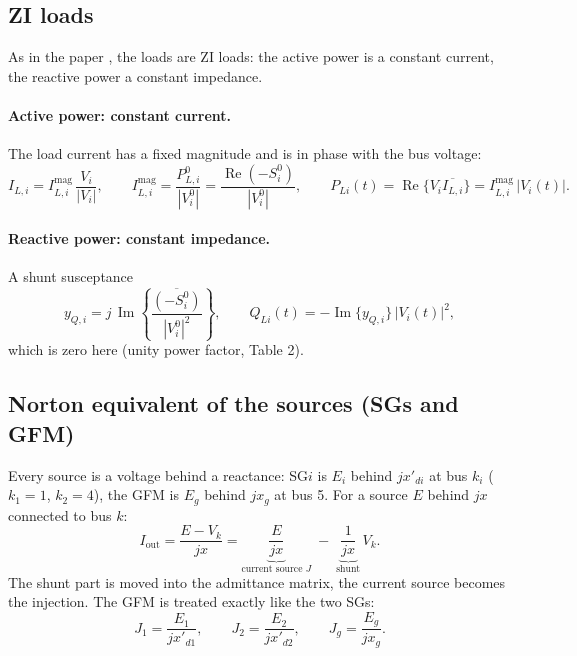 \documentclass[11pt,a4paper]{article}
\numberwithin{equation}{section}
\newcommand{\cj}[1]{\overline{#1}}
\newcommand{\re}{\operatorname{Re}}
\newcommand{\im}{\operatorname{Im}}
\begin{document}
\subsection{ZI loads}
As in the paper \cite{RA2021access}, the loads are ZI loads: the active power is a constant current, the reactive power a constant impedance.
\paragraph{Active power: constant current.} The load current has a fixed magnitude and is in phase with the bus voltage:
\begin{equation}
I_{L,i} = I_{L,i}^{\text{mag}}\,\frac{V_i}{|V_i|},\qquad
I_{L,i}^{\text{mag}} = \frac{P_{L,i}^0}{|V_i^0|} = \frac{\re(-S_i^0)}{|V_i^0|},\qquad
P_{Li}(t) = \re\{V_i\cj{I_{L,i}}\} = I_{L,i}^{\text{mag}}\,|V_i(t)| .
\end{equation}
\paragraph{Reactive power: constant impedance.} A shunt susceptance
\begin{equation}
y_{Q,i} = j\,\im\!\left\{\frac{\cj{(-S_i^0)}}{|V_i^0|^2}\right\},\qquad Q_{Li}(t) = -\im\{y_{Q,i}\}\,|V_i(t)|^2,
\end{equation}
which is zero here (unity power factor, Table 2).

\subsection{Norton equivalent of the sources (SGs and GFM)}
Every source is a voltage behind a reactance: SG$i$ is $E_i$ behind $jx'_{di}$ at bus $k_i$ ($k_1=1$, $k_2=4$), the GFM is $E_g$ behind $jx_g$ at bus 5. For a source $E$ behind $jx$ connected to bus $k$:
\begin{equation}
I_{\text{out}} = \frac{E - V_k}{jx} = \underbrace{\frac{E}{jx}}_{\text{current source } J}\; - \;\underbrace{\frac{1}{jx}}_{\text{shunt}}\,V_k .
\end{equation}
The shunt part is moved into the admittance matrix, the current source becomes the injection. The GFM is treated exactly like the two SGs:
\begin{equation}
J_1 = \frac{E_1}{jx'_{d1}},\qquad J_2 = \frac{E_2}{jx'_{d2}},\qquad J_g = \frac{E_g}{jx_g}.
\end{equation}
\end{document}
